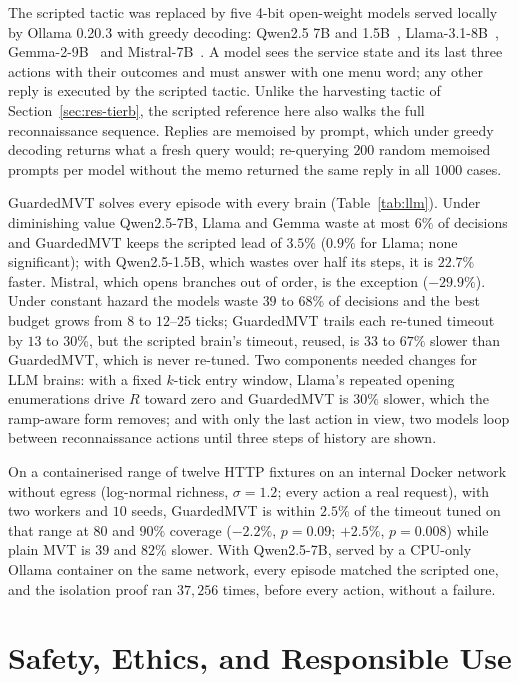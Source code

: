 \documentclass[runningheads]{llncs}
\newcommand{\RR}{R}
\begin{document}
The scripted tactic was replaced by five 4-bit open-weight models served locally by Ollama
0.20.3 with greedy decoding: Qwen2.5 7B and 1.5B~\cite{qwen2024qwen25},
Llama-3.1-8B~\cite{grattafiori2024llama3}, Gemma-2-9B~\cite{gemma2024gemma2} and
Mistral-7B~\cite{jiang2023mistral}. A model sees the service state and its last three
actions with their outcomes and must answer with one menu word; any other reply is executed
by the scripted tactic. Unlike the harvesting tactic of Section~\ref{sec:res-tierb}, the scripted reference here
also walks the full reconnaissance sequence. Replies are memoised by prompt, which under greedy decoding returns what a fresh
query would; re-querying $200$ random memoised prompts per model without the memo returned
the same reply in all $1000$ cases.

GuardedMVT solves every episode with every brain (Table~\ref{tab:llm}). Under diminishing
value Qwen2.5-7B, Llama and Gemma waste at most $6\%$ of decisions and GuardedMVT keeps the
scripted lead of $3.5\%$ ($0.9\%$ for Llama; none significant); with Qwen2.5-1.5B, which wastes over half its steps, it is
$22.7\%$ faster. Mistral, which opens branches out of order, is the exception ($-29.9\%$). Under constant hazard the models waste
$39$ to $68\%$ of decisions and the best budget grows from $8$ to $12$--$25$ ticks; GuardedMVT
trails each re-tuned timeout by $13$ to $30\%$, but the scripted brain's timeout, reused, is
$33$ to $67\%$ slower than GuardedMVT, which is never re-tuned. Two components needed
changes for LLM brains: with a fixed $k$-tick entry window, Llama's repeated opening
enumerations drive $\RR$ toward zero and GuardedMVT is $30\%$ slower, which the ramp-aware
form removes; and with only the last action in view, two models loop between
reconnaissance actions until three steps of history are shown.

On a containerised range of twelve HTTP fixtures on an internal Docker network without
egress (log-normal richness, $\sigma=1.2$; every action a real request), with two workers and
$10$ seeds, GuardedMVT is within $2.5\%$ of the timeout tuned on that range at $80$ and
$90\%$ coverage ($-2.2\%$, $p=0.09$; $+2.5\%$, $p=0.008$) while plain MVT is $39$ and $82\%$
slower. With Qwen2.5-7B, served by a CPU-only Ollama container on the same network, every episode
matched the scripted one, and the isolation proof ran $37{,}256$ times, before every action,
without a failure.

\section{Safety, Ethics, and Responsible Use}
\label{sec:safety}
\end{document}
